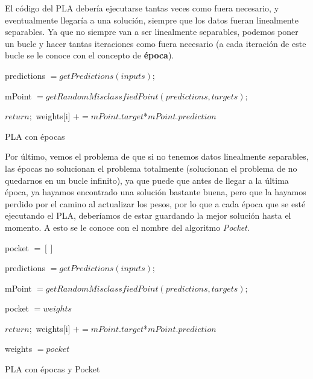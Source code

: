 El código del PLA debería ejecutarse tantas veces como fuera necesario, y eventualmente llegaría a una solución, siempre que los datos fueran linealmente separables. Ya que no siempre van a ser linealmente separables, podemos poner un bucle y hacer tantas iteraciones como fuera necesario (a cada iteración de este bucle se le conoce con el concepto de \textbf{época}).

\vspace{2mm}
\begin{algorithm}[H]
    {
        predictions $= getPredictions(inputs);$
        
        mPoint $= getRandomMisclassfiedPoint(predictions, targets);$
        
        {
    		$return;$
    	}
    	{
            {
                weights[i] $+= mPoint.target$*$mPoint.prediction$
            }
    	}
	}
	\caption{PLA con épocas}
	\label{alg:plawithepochs}
\end{algorithm}
\vspace{2mm}

Por último, vemos el problema de que si no tenemos datos linealmente separables, las épocas no solucionan el problema totalmente (solucionan el problema de no quedarnos en un bucle infinito), ya que puede que antes de llegar a la última época, ya hayamos encontrado una solución bastante buena, pero que la hayamos perdido por el camino al actualizar los pesos, por lo que a cada época que se esté ejecutando el PLA, deberíamos de estar guardando la mejor solución hasta el momento. A esto se le conoce con el nombre del algoritmo \textit{Pocket}.

\newpage
\begin{algorithm}[H]
    pocket $= []$
    
    {
        predictions $= getPredictions(inputs);$
        
        mPoint $= getRandomMisclassfiedPoint(predictions, targets);$
        
        {
            pocket $= weights$
        }
        
        {
    		$return;$
    	}
    	{
            {
                weights[i] $+= mPoint.target$*$mPoint.prediction$
            }
    	}
	}
	
	{
	    weights $= pocket$
	}
	\caption{PLA con épocas y Pocket}
	\label{alg:plawithepochsandpocket}
\end{algorithm}
\vspace{2mm}

